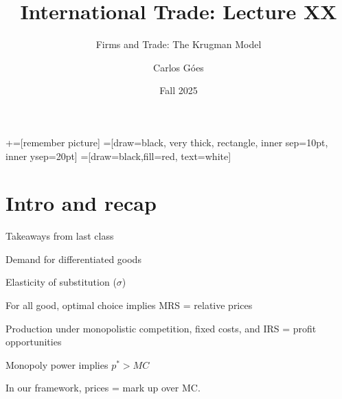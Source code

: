 \documentclass[notes,11pt, aspectratio=169, xcolor=table]{beamer}
\title[]{International Trade: Lecture XX}
\subtitle[]{Firms and Trade: The Krugman Model}
\author[Góes]
{Carlos Góes\inst{1}}
\date{Fall 2025}
\institute[GWU]{\inst{1} George Washington University }
\newenvironment{wideitemize}{\itemize\addtolength{\itemsep}{10pt}}{\enditemize}
\begin{document}
\newcommand\marktopleft[1]{%
    \tikz[overlay,remember picture] 
        \node (marker-#1-a) at (-.3em,.3em) {};%
}
\newcommand\markbottomright[2]{%
    \tikz[overlay,remember picture] 
        \node (marker-#1-b) at (0em,0em) {};%
}
+=[remember picture] 
 =[draw=black, very thick, rectangle, inner sep=10pt, inner ysep=20pt]
 =[draw=black,fill=red, text=white]















\frame{\titlepage}
\addtocounter{framenumber}{-1}

\section{Intro and recap}

\begin{frame}{Takeaways from last class}
\begin{wideitemize}
    \item Demand for differentiated goods
    \item Elasticity of substitution ($\sigma$)
    \item For all good, optimal choice implies MRS = relative prices
    \item Production under monopolistic competition, fixed costs, and IRS = profit opportunities
    \item Monopoly power implies $p^* > MC$
    \item In our framework, prices = mark up over MC.
    \end{wideitemize}
 \end{frame}
\end{document}
